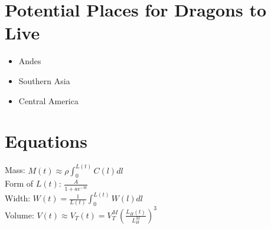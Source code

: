 \documentclass{article}
\begin{document}
\section{Potential Places for Dragons to Live}
\begin{itemize}
\item Andes
\item Southern Asia
\item Central America
\end{itemize}

\section{Equations}
Mass: $M(t)\approx \rho\int_0^{L(t)}C(l)dl$\\
Form of $L(t)$: $\frac{A}{1+ae^{-bt}}$\\
Width: $W(t)=\frac{1}{L(t)}\int_0^{L(t)}W(l)dl$\\
Volume: $V(t)\approx V_T(t)=V_T^M\left(\frac{L_H(t)}{L_H^M}\right)^3$\\
\end{document}
